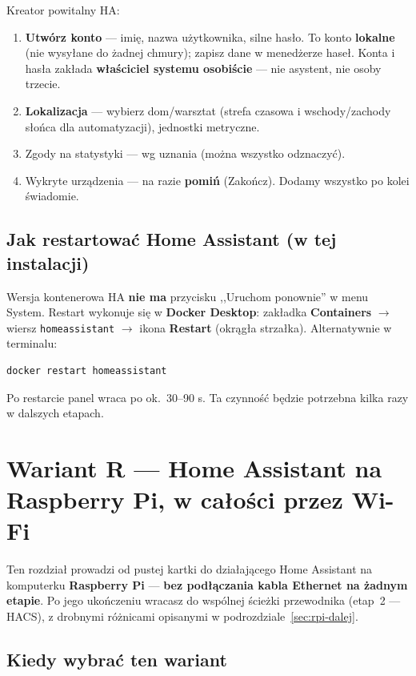 \documentclass[11pt,a4paper]{article}
\begin{document}
Kreator powitalny HA:
\begin{enumerate}
\item \textbf{Utwórz konto} --- imię, nazwa użytkownika, silne hasło. To konto \textbf{lokalne} (nie wysyłane do żadnej chmury); zapisz dane w menedżerze haseł. Konta i hasła zakłada \textbf{właściciel systemu osobiście} --- nie asystent, nie osoby trzecie.
\item \textbf{Lokalizacja} --- wybierz dom/warsztat (strefa czasowa i wschody/zachody słońca dla automatyzacji), jednostki metryczne.
\item Zgody na statystyki --- wg uznania (można wszystko odznaczyć).
\item Wykryte urządzenia --- na razie \textbf{pomiń} (Zakończ). Dodamy wszystko po kolei świadomie.
\end{enumerate}

\subsection{Jak restartować Home Assistant (w tej instalacji)}
\label{sec:restart}

Wersja kontenerowa HA \textbf{nie ma} przycisku ,,Uruchom ponownie'' w menu System. Restart wykonuje się w \textbf{Docker Desktop}: zakładka \textbf{Containers} $\to$ wiersz \texttt{homeassistant} $\to$ ikona \textbf{Restart} (okrągła strzałka). Alternatywnie w terminalu:

\begin{lstlisting}
docker restart homeassistant
\end{lstlisting}

Po restarcie panel wraca po ok.~30--90 s. Ta czynność będzie potrzebna kilka razy w dalszych etapach.

\section{Wariant R --- Home Assistant na Raspberry Pi, w całości przez Wi-Fi}
\label{sec:rpi}

Ten rozdział prowadzi od pustej kartki do działającego Home Assistant na komputerku \textbf{Raspberry Pi} --- \textbf{bez podłączania kabla Ethernet na żadnym etapie}. Po jego ukończeniu wracasz do wspólnej ścieżki przewodnika (etap~2 --- HACS), z drobnymi różnicami opisanymi w podrozdziale~\ref{sec:rpi-dalej}.

\subsection{Kiedy wybrać ten wariant}
\end{document}
